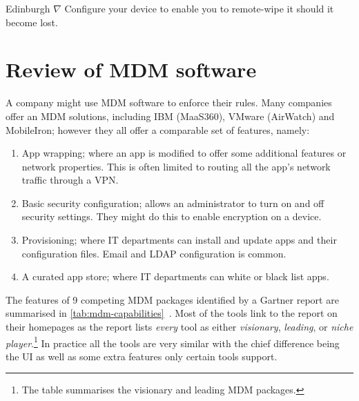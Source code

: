 \documentclass[thesis.tex]{subfiles}
\begin{document}
\begin{policyrule}{Edinburgh}
  $\nabla$ Configure your device to enable you to remote-wipe it should it become lost.
\end{policyrule}


\section{Review of \ac{MDM} software}

A company might use \ac{MDM} software to enforce
their rules.   Many companies offer an \ac{MDM} solutions, including IBM
(MaaS360), VMware (AirWatch) and MobileIron; however they all offer a
comparable set of features, namely:
\begin{enumerate}
\item App wrapping; where an app is modified to offer some additional features
  or network properties. This is often limited to routing all the app's
  network traffic through a VPN.
\item Basic security configuration; allows an administrator to turn on and
  off security settings. They might do this to enable encryption on a device.
\item Provisioning; where IT departments can install and update apps and
  their configuration files. Email and LDAP configuration is common.
\item A curated app store; where IT departments can white or black list apps.
\end{enumerate}

The features of 9 competing \ac{MDM} packages identified by a Gartner report are
summarised in \autoref{tab:mdm-capabilities}~\cite{rob_smith_magic_2016}.  Most
of the tools link to the report on their homepages as the report lists \emph{every} tool as
either \emph{visionary}, \emph{leading}, or \emph{niche player}.\footnote{The
  table summarises the visionary and leading \ac{MDM} packages.}  In practice all the
tools are very similar with the chief difference being the UI as well as some
extra features only certain tools support.
\end{document}
